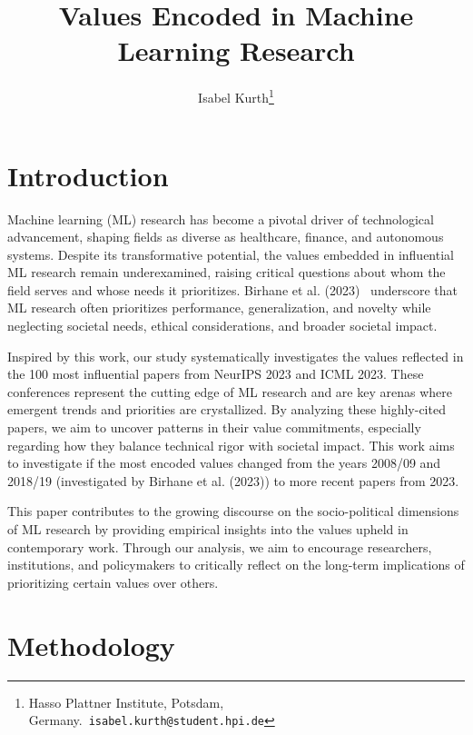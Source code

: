 \documentclass{article}
\title{Values Encoded in Machine Learning Research}
\author{Isabel Kurth\thanks{Hasso Plattner Institute, Potsdam, Germany.\ \texttt{isabel.kurth@student.hpi.de}}}
\begin{document}
\maketitle
\thispagestyle{plain}

\begin{abstract}
\end{abstract}

\section{Introduction}
Machine learning (ML) research has become a pivotal driver of technological advancement, shaping fields as diverse as healthcare, finance, 
and autonomous systems. Despite its transformative potential, the values embedded in influential ML research remain underexamined, raising 
critical questions about whom the field serves and whose needs it prioritizes. Birhane et al. (2023)~\cite{valuesInML2021} underscore that ML research often prioritizes 
performance, generalization, and novelty while neglecting societal needs, ethical considerations, and broader societal impact.

Inspired by this work, our study systematically investigates the values reflected in the 100 most influential papers from NeurIPS 2023 and ICML 2023. 
These conferences represent the cutting edge of ML research and are key arenas where emergent trends and priorities are crystallized. 
By analyzing these highly-cited papers, we aim to uncover patterns in their value commitments, especially regarding how they balance technical rigor 
with societal impact. This work aims to investigate if the most encoded values changed from the years 2008/09 and 2018/19 
(investigated by Birhane et al. (2023)) to more recent papers from 2023.

This paper contributes to the growing discourse on the socio-political dimensions of ML research by providing empirical insights into the values 
upheld in contemporary work. Through our analysis, we aim to encourage researchers, institutions, and policymakers to critically reflect on the 
long-term implications of prioritizing certain values over others.

\section{Methodology}
\end{document}
